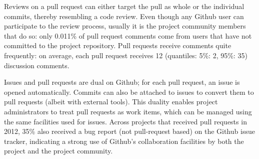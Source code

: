 \documentclass{sig-alternate}
\begin{document}
Reviews on a pull request can either target the pull as whole or the individual commits,
thereby resembling a code review. 
Even though any Github user can participate to the
review process, usually it is the project community members that do so:
only 0.011\% of pull request comments come from users that have not
committed to the project repository.
Pull requests receive comments quite frequently: on average, each pull
request receives 12 (quantiles: 5\%: 2, 95\%: 35) discussion comments.

Issues and pull requests are dual on Github; for each pull request, an issue is
opened automatically. Commits can also be attached to issues to convert them to
pull requests (albeit with external tools). This duality enables project
administrators to treat pull requests as work items, which can be managed using
the same facilities used for issues. Across projects that received pull
requests in 2012, 35\% also received a bug report (not pull-request based) 
on the Github issue tracker, indicating a strong use of Github's collaboration
facilities by both the project and the project community.

%
\end{document}

